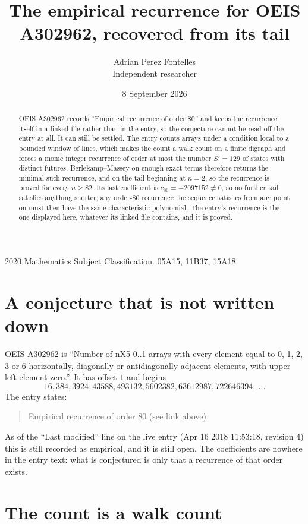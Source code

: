 \documentclass[11pt,a4paper]{article}
\title{The empirical recurrence for OEIS A302962, recovered from its tail}
\author{Adrian Perez Fontelles\\ \small Independent researcher}
\date{8 September 2026}
\theoremstyle{plain}
\theoremstyle{definition}
\begin{document}
\maketitle

\begin{abstract}
OEIS A302962 records ``Empirical recurrence of order $80$'' and keeps the recurrence itself in
a linked file rather than in the entry, so the conjecture cannot be read off the entry at all.
It can still be settled. The entry counts arrays under a condition local to a bounded window of
lines, which makes the count a walk count on a finite digraph and forces a monic integer
recurrence of order at most the number $S'=129$ of states with distinct futures. Berlekamp--Massey on
enough exact terms therefore returns the minimal such recurrence, and on the tail beginning at $n=2$, so the recurrence is proved for every $n\ge82$.
Its last coefficient is $c_{80}=-2097152\neq0$, so no further tail satisfies anything
shorter; any order-$80$ recurrence the sequence satisfies from any point on must then have
the same characteristic polynomial. The entry's recurrence is the one displayed here, whatever
its linked file contains, and it is proved.
\end{abstract}

\noindent\small 2020 Mathematics Subject Classification. 05A15, 11B37, 15A18.\normalsize

\section{A conjecture that is not written down}

OEIS A302962 is ``Number of nX5 0..1 arrays with every element equal to 0, 1, 2, 3 or 6 horizontally, diagonally or antidiagonally adjacent elements, with upper left element zero.''. It has offset $1$ and begins
\[
16, 384, 3924, 43588, 493132, 5602382, 63612987, 722646394,\ \dots
\]
The entry states:
\begin{quote}
Empirical recurrence of order 80 (see link above)
\end{quote}
As of the ``Last modified'' line on the live entry (Apr 16 2018 11:53:18, revision 4)
this is still recorded as empirical, and it is still open. The coefficients are nowhere in the
entry text: what is conjectured is only that a recurrence of that order exists.

\section{The count is a walk count}
\end{document}
